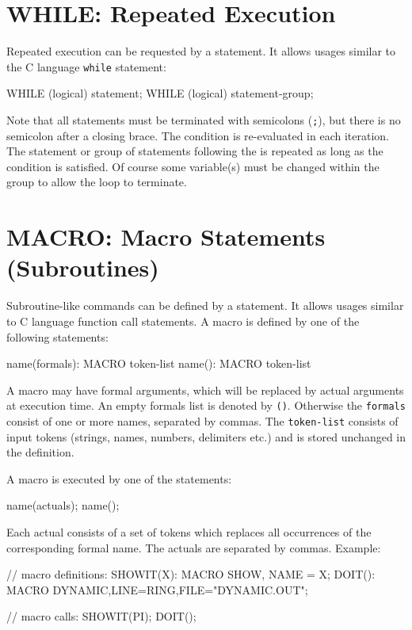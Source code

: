 \section{WHILE: Repeated Execution}
\label{sec:while}
Repeated execution can be requested by a  statement.
It allows usages similar to the C language \texttt{while} statement:
\begin{example}
WHILE (logical) statement;
WHILE (logical) { statement-group; }
\end{example}
Note that all statements must be terminated with semicolons (\texttt{;}),
but there is no semicolon after a closing brace.
The condition is re-evaluated in each iteration.
The statement or group of statements following the  is
repeated as long as the condition is satisfied.
Of course some variable(s) must be changed within the  group
to allow the loop to terminate.

\section{MACRO: Macro Statements (Subroutines)}
\label{sec:macro}
Subroutine-like commands can be defined by a  statement.
It allows usages similar to C language function call statements.
A macro is defined by one of the following statements:
\begin{example}
name(formals): MACRO { token-list }
name(): MACRO { token-list }
\end{example}
A macro may have formal arguments, which will be replaced by actual arguments
at execution time. An empty formals list is denoted by \texttt{()}.
Otherwise the \texttt{formals} consist of one or more names,
separated by commas.
The \texttt{token-list} consists of input tokens
(strings, names, numbers, delimiters etc.)
and is stored unchanged in the definition.

A macro is executed by one of the statements:
\begin{example}
name(actuals);
name();
\end{example}
Each actual consists of a set of tokens which replaces all occurrences of
the corresponding formal name.
The actuals are separated by commas.
\noindent Example:
\begin{example}
// macro definitions:
SHOWIT(X): MACRO {
   SHOW, NAME = X;
}
DOIT(): MACRO {
   DYNAMIC,LINE=RING,FILE="DYNAMIC.OUT";
}

// macro calls:
SHOWIT(PI);
DOIT();
\end{example}


